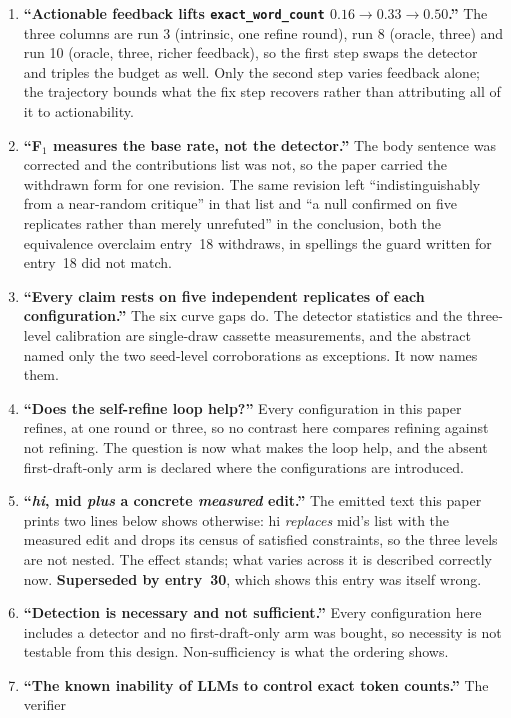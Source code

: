 \documentclass[11pt]{article}
\begin{document}
\begin{enumerate}
  \item \textbf{``Actionable feedback lifts \texttt{exact\_word\_count} $0.16 \to 0.33 \to
    0.50$.''} The three columns are run 3 (intrinsic, one refine round), run 8 (oracle, three)
    and run 10 (oracle, three, richer feedback), so the first step swaps the detector and triples
    the budget as well. Only the second step varies feedback alone; the trajectory bounds what
    the fix step recovers rather than attributing all of it to actionability.
  \item \textbf{``F$_1$ measures the base rate, not the detector.''} The body sentence was
    corrected and the contributions list was not, so the paper carried the withdrawn form for
    one revision. The same revision left ``indistinguishably from a near-random critique'' in
    that list and ``a null confirmed on five replicates rather than merely unrefuted'' in the
    conclusion, both the equivalence overclaim entry~18 withdraws, in spellings the guard
    written for entry~18 did not match.
  \item \textbf{``Every claim rests on five independent replicates of each configuration.''} The
    six curve gaps do. The detector statistics and the three-level calibration are single-draw
    cassette measurements, and the abstract named only the two seed-level corroborations as
    exceptions. It now names them.
  \item \textbf{``Does the self-refine loop help?''} Every configuration in this paper refines,
    at one round or three, so no contrast here compares refining against not refining. The
    question is now what makes the loop help, and the absent first-draft-only arm is declared
    where the configurations are introduced.
  \item \textbf{``\emph{hi}, mid \emph{plus} a concrete \emph{measured} edit.''} The emitted
    text this paper prints two lines below shows otherwise: hi \emph{replaces} mid's list with
    the measured edit and drops its census of satisfied constraints, so the three levels are not
    nested. The effect stands; what varies across it is described correctly now.
    \textbf{Superseded by entry~30}, which shows this entry was itself wrong.
  \item \textbf{``Detection is necessary and not sufficient.''} Every configuration here
    includes a detector and no first-draft-only arm was bought, so necessity is not testable
    from this design. Non-sufficiency is what the ordering shows.
  \item \textbf{``The known inability of LLMs to control exact token counts.''} The verifier

\end{enumerate}
\end{document}
